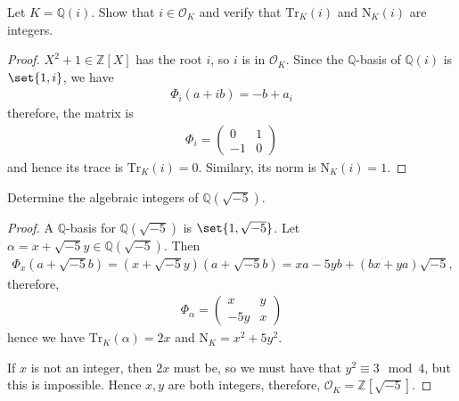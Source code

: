 \begin{example}
    Let \(K = \mathbb{Q}(i)\). Show that \(i \in \mathcal{O}_K\) and verify that \(\mathrm{Tr}_K(i)\) and \(\mathrm{N}_K(i)\) are integers.
\end{example}
\begin{proof}
    \(X^2 + 1 \in \mathbb{Z}[X]\) has the root \(i\), so \(i\) is in \(\mathcal{O}_K\). Since the \(\mathbb{Q}\)-basis of \(\mathbb{Q}(i)\) is \(\set{1, i}\), we have
    \begin{align*}
        \Phi_i(a + ib) = -b + a_i
    \end{align*}
    therefore, the matrix is
    \begin{align*}
        \Phi_i =
        \begin{pmatrix}
            0 & 1 \\ -1 & 0
        \end{pmatrix}
    \end{align*}
    and hence its trace is \(\mathrm{Tr}_K(i) = 0\). Similary, its norm is \(\mathrm{N}_K(i) = 1\).
\end{proof}
\begin{example}
    Determine the algebraic integers of \(\mathbb{Q}(\sqrt{-5})\).
\end{example}

\begin{proof}
    A \(\mathbb{Q}\)-basis for \(\mathbb{Q}(\sqrt{-5})\) is \(\set{1, \sqrt{-5}}\). Let \(\alpha = x + \sqrt{-5}y \in \mathbb{Q}(\sqrt{-5})\). Then
    \begin{align*}
        \Phi_x (a + \sqrt{-5} b) = (x + \sqrt{-5}y)(a + \sqrt{-5}b) = xa -5 yb + (bx + ya) \sqrt{-5} \text{,} 
    \end{align*}
    therefore,
    \begin{align*}
        \Phi_\alpha =
        \begin{pmatrix}
            x & y \\ -5 y & x
        \end{pmatrix}
    \end{align*}
    hence we have \(\mathrm{Tr}_K(\alpha) = 2x\) and \(\mathrm{N}_K = x^2 + 5y^2\).

    If \(x\) is not an integer, then \(2x\) must be, so we must have that \(y^2 \equiv 3 \mod 4\), but this is impossible. Hence \(x, y\) are both integers, therefore, \(\mathcal{O}_K = \mathbb{Z}[\sqrt{-5}]\).
\end{proof}

